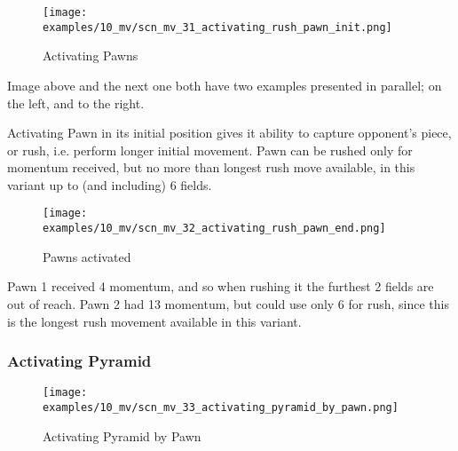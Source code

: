 \vspace*{-1.4\baselineskip}
\noindent
\begin{figure}[!h]
\texttt{[image: examples/10\_mv/scn\_mv\_31\_activating\_rush\_pawn\_init.png]}
\vspace*{-1.3\baselineskip}
\caption{Activating Pawns}
\label{fig:scn_mv_31_activating_rush_pawn_init}
\end{figure}

\vspace*{-0.3\baselineskip}
Image above and the next one both have two examples presented in parallel; on the left,
and to the right.

Activating Pawn in its initial position gives it ability to capture opponent's
piece, or rush, i.e. perform longer initial movement. Pawn can be rushed only for
momentum received, but no more than longest rush move available, in this variant
up to (and including) 6 fields.

\clearpage %

\vspace*{-2.1\baselineskip}
\noindent
\begin{figure}[!h]
\texttt{[image: examples/10\_mv/scn\_mv\_32\_activating\_rush\_pawn\_end.png]}
\caption{Pawns activated}
\label{fig:scn_mv_32_activating_rush_pawn_end}
\end{figure}

Pawn 1 received 4 momentum, and so when rushing it the furthest 2 fields are out
of reach. Pawn 2 had 13 momentum, but could use only 6 for rush, since this is the
longest rush movement available in this variant.

\clearpage %

\subsubsection*{Activating Pyramid}
\label{sec:Miranda's veil/Wave/Cascading Waves/Activating Pyramid}

\vspace*{-1.4\baselineskip}
\noindent
\begin{figure}[!h]
\texttt{[image: examples/10\_mv/scn\_mv\_33\_activating\_pyramid\_by\_pawn.png]}
\vspace*{-1.3\baselineskip}
\caption{Activating Pyramid by Pawn}
\label{fig:scn_mv_33_activating_pyramid_by_pawn}
\end{figure}

